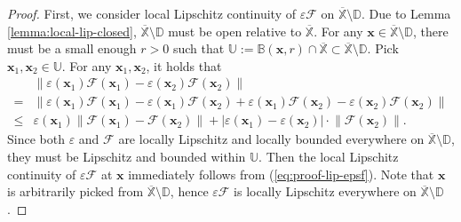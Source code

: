 \documentclass{amsart} %
\def\eqref#1{equation~\ref{#1}}
\def\vx{{\bm{x}}}
\def\sB{{\mathbb{B}}}
\def\sD{{\mathbb{D}}}
\def\sU{{\mathbb{U}}}
\def\sX{{\mathbb{X}}}
\def\cF{{\mathcal{F}}}
\theoremstyle{definition}
\theoremstyle{remark}
\renewcommand{\eqref}[1]{\textup{(\ref{#1})}}
\begin{document}
\begin{proof}
First, we consider local Lipschitz continuity of $\varepsilon\cF$ on $\overline{\sX}\setminus\sD$. Due to Lemma \ref{lemma:local-lip-closed}, $\overline{\sX}\setminus\sD$ must be open relative to $\overline{\sX}$.
For any $\vx \in \overline{\sX}\setminus\sD$, there must be a small enough $r>0$ such that $\sU:=\sB(\vx,r) \cap \overline{\sX} \subset \overline{\sX}\setminus\sD$. Pick $\vx_1,\vx_2 \in \sU$. For any $\vx_1,\vx_2$, it holds that
\begin{equation}
\label{eq:proof-lip-epsf}
\begin{aligned}
   & \|\varepsilon(\vx_1)\cF(\vx_1) - \varepsilon(\vx_2)\cF(\vx_2)\| \\
   = & \|\varepsilon(\vx_1)\cF(\vx_1) - \varepsilon(\vx_1)\cF(\vx_2) + \varepsilon(\vx_1)\cF(\vx_2) -\varepsilon(\vx_2)\cF(\vx_2)\| \\
   \leq & \varepsilon(\vx_1) \big\|\cF(\vx_1) - \cF(\vx_2)\big\| + |\varepsilon(\vx_1) -\varepsilon(\vx_2)| \cdot \big \|\cF(\vx_2)\big \|. 
\end{aligned}
\end{equation}
Since both $\varepsilon$ and $\cF$ are locally Lipschitz and locally bounded everywhere on $\overline{\sX}\setminus\sD$, they must be Lipschitz and bounded within $\sU$. Then the local Lipschitz continuity of $\varepsilon \cF$ at $\vx$ immediately follows from \eqref{eq:proof-lip-epsf}. Note that $\vx$ is arbitrarily picked from $\overline{\sX}\setminus\sD$, hence $\varepsilon \cF$ is locally Lipschitz everywhere on $\overline{\sX}\setminus\sD$. 


\end{proof}
\end{document}
